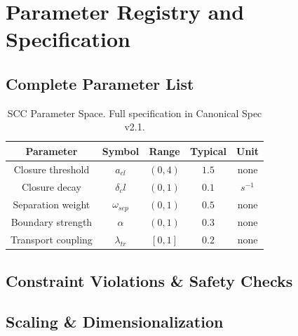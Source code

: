 \chapter{Parameter Registry and Specification}
\label{app:parameters}


\section{Complete Parameter List}

\begin{table}[htbp]
  \centering
  \begin{tabular}{|c|c|c|c|c|}
    \hline
    Parameter & Symbol & Range & Typical & Unit \\
    \hline
    Closure threshold & $a_{cl}$ & $(0, 4)$ & $1.5$ & none \\
    Closure decay & $\delta_cl$ & $(0, 1)$ & $0.1$ & $s^{-1}$ \\
    Separation weight & $\omega_{sep}$ & $(0, 1)$ & $0.5$ & none \\
    Boundary strength & $\alpha$ & $(0, 1)$ & $0.3$ & none \\
    Transport coupling & $\lambda_{tr}$ & $[0, 1]$ & $0.2$ & none \\
    \hline
  \end{tabular}
  \caption{SCC Parameter Space. Full specification in Canonical Spec v2.1.}
\end{table}

\section{Constraint Violations \& Safety Checks}


\section{Scaling \& Dimensionalization}


\cleardoublepage
